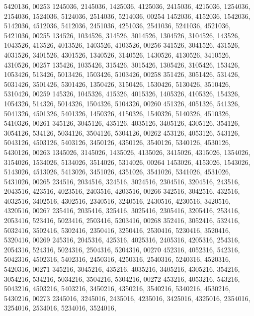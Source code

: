 \begin{DoxyCode}
      5420136,
00253       1245036, 2145036, 1425036, 4125036, 2415036, 4215036, 1254036, 2154036, 1524036, 5124036, 2514036, 
      5214036,
00254       1452036, 4152036, 1542036, 5142036, 4512036, 5412036, 2451036, 4251036, 2541036, 5241036, 4521036, 
      5421036,
00255        134526, 1034526,  314526, 3014526, 1304526, 3104526,  143526, 1043526,  413526, 4013526, 1403526, 
      4103526,
00256        341526, 3041526,  431526, 4031526, 3401526, 4301526, 1340526, 3140526, 1430526, 4130526, 3410526, 
      4310526,
00257        135426, 1035426,  315426, 3015426, 1305426, 3105426,  153426, 1053426,  513426, 5013426, 1503426, 
      5103426,
00258        351426, 3051426,  531426, 5031426, 3501426, 5301426, 1350426, 3150426, 1530426, 5130426, 3510426, 
      5310426,
00259        145326, 1045326,  415326, 4015326, 1405326, 4105326,  154326, 1054326,  514326, 5014326, 1504326, 
      5104326,
00260        451326, 4051326,  541326, 5041326, 4501326, 5401326, 1450326, 4150326, 1540326, 5140326, 4510326, 
      5410326,
00261        345126, 3045126,  435126, 4035126, 3405126, 4305126,  354126, 3054126,  534126, 5034126, 3504126, 
      5304126,
00262        453126, 4053126,  543126, 5043126, 4503126, 5403126, 3450126, 4350126, 3540126, 5340126, 4530126, 
      5430126,
00263       1345026, 3145026, 1435026, 4135026, 3415026, 4315026, 1354026, 3154026, 1534026, 5134026, 3514026, 
      5314026,
00264       1453026, 4153026, 1543026, 5143026, 4513026, 5413026, 3451026, 4351026, 3541026, 5341026, 4531026, 
      5431026,
00265        234516, 2034516,  324516, 3024516, 2304516, 3204516,  243516, 2043516,  423516, 4023516, 2403516, 
      4203516,
00266        342516, 3042516,  432516, 4032516, 3402516, 4302516, 2340516, 3240516, 2430516, 4230516, 3420516, 
      4320516,
00267        235416, 2035416,  325416, 3025416, 2305416, 3205416,  253416, 2053416,  523416, 5023416, 2503416, 
      5203416,
00268        352416, 3052416,  532416, 5032416, 3502416, 5302416, 2350416, 3250416, 2530416, 5230416, 3520416, 
      5320416,
00269        245316, 2045316,  425316, 4025316, 2405316, 4205316,  254316, 2054316,  524316, 5024316, 2504316, 
      5204316,
00270        452316, 4052316,  542316, 5042316, 4502316, 5402316, 2450316, 4250316, 2540316, 5240316, 4520316, 
      5420316,
00271        345216, 3045216,  435216, 4035216, 3405216, 4305216,  354216, 3054216,  534216, 5034216, 3504216, 
      5304216,
00272        453216, 4053216,  543216, 5043216, 4503216, 5403216, 3450216, 4350216, 3540216, 5340216, 4530216, 
      5430216,
00273       2345016, 3245016, 2435016, 4235016, 3425016, 4325016, 2354016, 3254016, 2534016, 5234016, 3524016, 

\end{DoxyCode}

